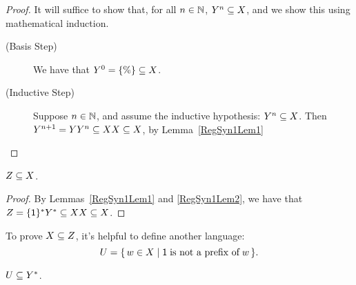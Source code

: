 \begin{proof}
It will suffice to show that, for all $n\in\mathbb{N}$, $Y^n\subseteq X$, and
we show this using mathematical induction.
\begin{description}
\item[\quad(Basis Step)] We have that $Y^0 = \{\%\}\subseteq X$.

\item[\quad(Inductive Step)] Suppose $n\in\mathbb{N}$, and assume the
inductive hypothesis: $Y^n\subseteq X$. Then $Y^{n+1} = YY^n\subseteq XX\subseteq X$,
by Lemma~\ref{RegSyn1Lem1}
\end{description}
\end{proof}

\begin{lemma}
\label{RegSyn1Lem3}
$Z\subseteq X$.
\end{lemma}

\begin{proof}
By Lemmas~\ref{RegSyn1Lem1} and \ref{RegSyn1Lem2}, we have that
$Z = \{\mathsf{1}\}^*Y^* \subseteq XX \subseteq X$.
\end{proof}

To prove $X\subseteq Z$, it's helpful to define another language:
\begin{displaymath}
  U = \{ \, w\in X \mid \mathsf{1}\;\allowbreak\mbox{is not a prefix of}\allowbreak\; w \, \} .
\end{displaymath}

\begin{lemma}
\label{RegSyn1Lem4}
$U\subseteq Y^*$.
\end{lemma}

